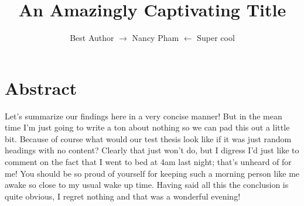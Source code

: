 \documentclass[]{article}
\begin{document}
\title{An Amazingly Captivating Title}
\author {Best Author $\rightarrow$ Nancy Pham  $\leftarrow$  Super cool}

\maketitle

\newpage
\tableofcontents
\newpage

\section{Abstract}
Let's summarize our findings here in a very concise manner! But in the mean time I'm just going to write a ton about nothing so we can pad this out a little bit. Because of course what would our test thesis look like if it was just random headings with no content? Clearly that just won't do, but I digress I'd just like to comment on the fact that I went to bed at 4am last night; that's unheard of for me! You should be so proud of yourself for keeping such a morning person like me awake so close to my usual wake up time. Having said all this the conclusion is quite obvious, I regret nothing and that was a wonderful evening!
\end{document}
